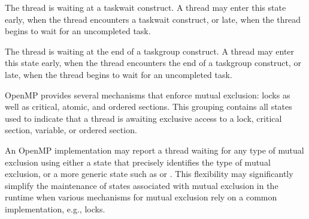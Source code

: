 
\begin{description}

\item {} 

  The thread is waiting at a taskwait construct. A 
  thread may enter this state early, when the
  thread encounters a taskwait construct, or late, when the thread
  begins to wait for an uncompleted task.

\item {} 

  The thread is waiting at the end of a taskgroup construct. A 
  thread may enter this state early, when the
  thread encounters the end of a taskgroup construct, or late, when the thread
  begins to wait for an uncompleted task.

\end{description}



OpenMP provides several mechanisms that enforce mutual exclusion:
locks as well as critical, atomic, and ordered sections.  This
grouping contains all states used to indicate that a thread is
awaiting exclusive access to a lock, critical section, variable,
or ordered section.

An OpenMP implementation may report a thread waiting for any type
of mutual exclusion using either a state that precisely identifies
the type of mutual exclusion, or  a more generic state such as
 or .  This
flexibility may significantly simplify the maintenance of states
associated with mutual exclusion in the runtime when various
mechanisms for mutual exclusion rely on a common implementation,
e.g., locks.


